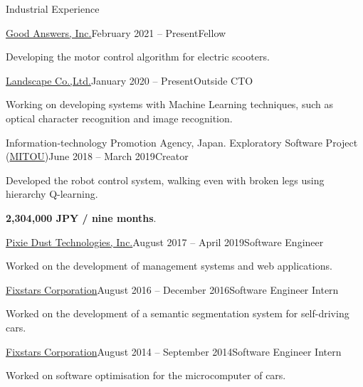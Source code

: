 \documentclass{resume} %
\begin{document}
\begin{rSection}{Industrial Experience}

    \begin{rSubsection}{\href{https://info.gbiz.go.jp/hojin/ichiran?hojinBango=2430001082637}{Good Answers, Inc.}}{February 2021 -- Present}{Fellow}{}
    \item Developing the motor control algorithm for electric scooters.
    \end{rSubsection}

    \begin{rSubsection}{\href{https://www.landscape.co.jp/}{Landscape Co.,Ltd.}}{January 2020 -- Present}{Outside CTO}{}
    \item Working on developing systems with Machine Learning techniques, such as optical character recognition and image recognition.
    \end{rSubsection}

    \begin{rSubsection}{Information-technology Promotion Agency, Japan. Exploratory Software Project (\href{https://www.mitou.org/}{MITOU})}{June 2018 -- March 2019}{Creator}{}
    \item Developed the robot control system, walking even with broken legs using hierarchy Q-learning.
    \item \textbf{2,304,000 JPY / nine months}.
    \end{rSubsection}

    \begin{rSubsection}{\href{http://pixiedusttech.com/}{Pixie Dust Technologies, Inc.}}{August 2017 -- April 2019}{Software Engineer}{}
    \item Worked on the development of management systems and web applications.
    \end{rSubsection}

    \begin{rSubsection}{\href{https://www.fixstars.com/en/}{Fixstars Corporation}}{August 2016 -- December 2016}{Software Engineer Intern}{}
    \item Worked on the development of a semantic segmentation system for self-driving cars.
    \end{rSubsection}

    \begin{rSubsection}{\href{https://www.fixstars.com/en/}{Fixstars Corporation}}{August 2014 -- September 2014}{Software Engineer Intern}{}
    \item Worked on software optimisation for the microcomputer of cars.
    \end{rSubsection}

\end{rSection}
\end{document}
